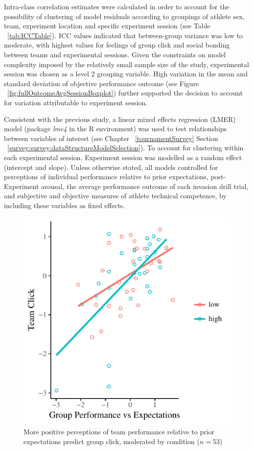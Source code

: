 

Intra-class correlation estimates were calculated in order to account for the possibility of clustering of model residuals according to groupings of athlete sex, team, experiment location and specific experiment session (see Table ~\ref{tab:ICCTable}). ICC values indicated that between-group variance was low to moderate, with highest values for feelings of group click and social bonding between teams and experimental sessions. Given the constraints on model complexity imposed by the relatively small sample size of the study, experimental session was chosen as a level 2 grouping variable. High variation in the mean and standard deviation of objective performance outcome (see Figure ~\ref{fig:fullOutcomeAvgSessionBoxplot}) further supported the decision to account for variation attributable to experiment session.

Consistent with the previous study, a linear mixed effects regression (LMER) model (package \textit{lme4} in the R environment) was used to test relationships between variables of interest (see Chapter ~\ref{tournamentSurvey} Section ~\ref{survey:survey:dataStructureModelSelection}). To account for clustering within each experimental session, Experiment session was modelled as a random effect (intercept and slope).  Unless otherwise stated, all models controlled for perceptions of individual performance relative to prior expectations, post-Experiment arousal, the average performance outcome of each invasion drill trial, and subjective and objective measures of athlete technical competence, by including these variables as fixed effects.



\begin{figure}
    \centering
    \includegraphics[width=0.5\linewidth,keepaspectratio] {images/teamPerfExpClickScatter-1}
    \caption{More positive perceptions of team performance relative to prior expectations predict group click, moderated by condition ($n = 53$)}
    \label{fig:teamPerfExpClickScatter}
\end{figure}

